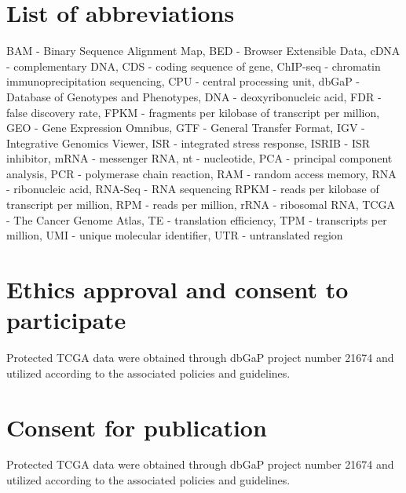 \documentclass[10pt, oneside]{article}
\begin{document}

\section*{List of abbreviations}
BAM - Binary Sequence Alignment Map,
BED - Browser Extensible Data,
cDNA - complementary DNA,
CDS - coding sequence of gene,
ChIP-seq - chromatin immunoprecipitation sequencing,
CPU - central processing unit,
dbGaP - Database of Genotypes and Phenotypes,
DNA - deoxyribonucleic acid,
FDR - false discovery rate,
FPKM - fragments per kilobase of transcript per million,
GEO - Gene Expression Omnibus,
GTF - General Transfer Format,
IGV - Integrative Genomics Viewer,
ISR - integrated stress response,
ISRIB - ISR inhibitor,
mRNA - messenger RNA,
nt - nucleotide,
PCA - principal component analysis,
PCR - polymerase chain reaction,
RAM - random access memory,
RNA - ribonucleic acid,
RNA-Seq - RNA sequencing
RPKM - reads per kilobase of transcript per million,
RPM - reads per million,
rRNA - ribosomal RNA,
TCGA - The Cancer Genome Atlas,
TE - translation efficiency,
TPM - transcripts per million,
UMI - unique molecular identifier,
UTR - untranslated region

\section*{Ethics approval and consent to participate}
Protected TCGA data were obtained through dbGaP project number 21674 and utilized according to the associated policies and guidelines.

\section*{Consent for publication}
Protected TCGA data were obtained through dbGaP project number 21674 and utilized according to the associated policies and guidelines.
\end{document}
